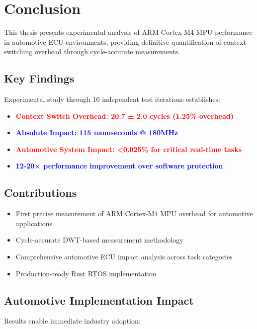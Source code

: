 \documentclass[12pt,a4paper,oneside]{report}
\newcommand{\keyresult}[1]{\textbf{\textcolor{red}{#1}}}
\newcommand{\measurement}[1]{\textbf{\textcolor{blue}{#1}}}
\begin{document}
\chapter{Conclusion}
\label{chap:conclusion}

This thesis presents experimental analysis of ARM Cortex-M4 MPU performance in automotive ECU environments, providing definitive quantification of context switching overhead through cycle-accurate measurements.

\section{Key Findings}

Experimental study through 10 independent test iterations establishes:

\begin{itemize}
    \item \keyresult{Context Switch Overhead: 20.7 ± 2.0 cycles (1.25\% overhead)}
    \item \measurement{Absolute Impact: 115 nanoseconds @ 180MHz}
    \item \keyresult{Automotive System Impact: <0.025\% for critical real-time tasks}
    \item \measurement{12-20× performance improvement over software protection}
\end{itemize}

\section{Contributions}

\begin{itemize}
    \item First precise measurement of ARM Cortex-M4 MPU overhead for automotive applications
    \item Cycle-accurate DWT-based measurement methodology
    \item Comprehensive automotive ECU impact analysis across task categories
    \item Production-ready Rust RTOS implementation
\end{itemize}

\section{Automotive Implementation Impact}

Results enable immediate industry adoption:
\end{document}
